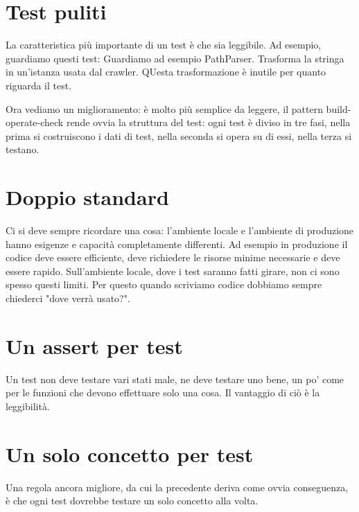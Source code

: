 \documentclass[11pt,a4paper]{book}
\begin{document}
\section{Test puliti}
La caratteristica più importante di un test è che sia leggibile. Ad esempio, guardiamo questi test:
\label{code: 053}
Guardiamo ad esempio PathParser. Trasforma la stringa in un'istanza usata dal crawler. QUesta trasformazione è inutile per quanto riguarda il test.

Ora vediamo un miglioramento:
\label{code: 054}
è molto più semplice da leggere, il pattern build-operate-check rende ovvia la struttura del test: ogni test è diviso in tre fasi, nella prima si costruiscono i dati di test, nella seconda si opera su di essi, nella terza si testano.

\section{Doppio standard}
Ci si deve sempre ricordare una cosa: l'ambiente locale e l'ambiente di produzione hanno esigenze e capacità completamente differenti. Ad esempio in produzione il codice deve essere efficiente, deve richiedere le risorse minime necessarie e deve essere rapido. Sull'ambiente locale, dove i test saranno fatti girare, non ci sono spesso questi limiti. Per questo quando scriviamo codice dobbiamo sempre chiederci "dove verrà usato?".

\section{Un assert per test}
Un test non deve testare vari stati male, ne deve testare uno bene, un po' come per le funzioni che devono effettuare solo una cosa. Il vantaggio di ciò è la leggibilità.

\section{Un solo concetto per test}
Una regola ancora migliore, da cui la precedente deriva come ovvia conseguenza, è che ogni test dovrebbe testare un solo concetto alla volta.
\end{document}

